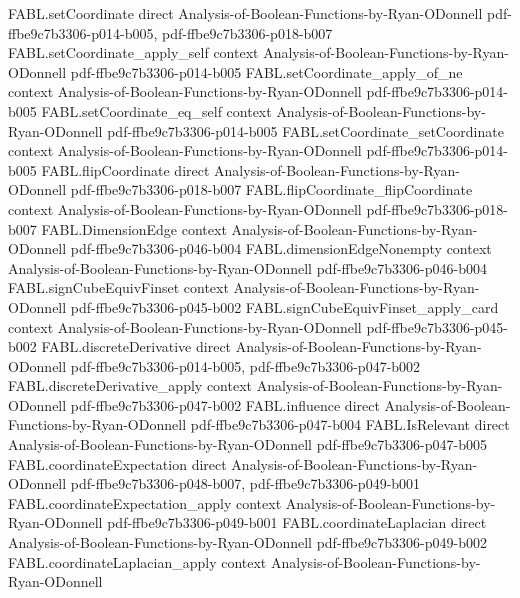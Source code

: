 \begin{theorem}
\proofstep
  {FABL.setCoordinate}
  {direct}
  {Analysis-of-Boolean-Functions-by-Ryan-ODonnell}
  {pdf-ffbe9c7b3306-p014-b005,
    pdf-ffbe9c7b3306-p018-b007}
\proofstep
  {FABL.setCoordinate_apply_self}
  {context}
  {Analysis-of-Boolean-Functions-by-Ryan-ODonnell}
  {pdf-ffbe9c7b3306-p014-b005}
\proofstep
  {FABL.setCoordinate_apply_of_ne}
  {context}
  {Analysis-of-Boolean-Functions-by-Ryan-ODonnell}
  {pdf-ffbe9c7b3306-p014-b005}
\proofstep
  {FABL.setCoordinate_eq_self}
  {context}
  {Analysis-of-Boolean-Functions-by-Ryan-ODonnell}
  {pdf-ffbe9c7b3306-p014-b005}
\proofstep
  {FABL.setCoordinate_setCoordinate}
  {context}
  {Analysis-of-Boolean-Functions-by-Ryan-ODonnell}
  {pdf-ffbe9c7b3306-p014-b005}
\proofstep
  {FABL.flipCoordinate}
  {direct}
  {Analysis-of-Boolean-Functions-by-Ryan-ODonnell}
  {pdf-ffbe9c7b3306-p018-b007}
\proofstep
  {FABL.flipCoordinate_flipCoordinate}
  {context}
  {Analysis-of-Boolean-Functions-by-Ryan-ODonnell}
  {pdf-ffbe9c7b3306-p018-b007}
\proofstep
  {FABL.DimensionEdge}
  {context}
  {Analysis-of-Boolean-Functions-by-Ryan-ODonnell}
  {pdf-ffbe9c7b3306-p046-b004}
\proofstep
  {FABL.dimensionEdgeNonempty}
  {context}
  {Analysis-of-Boolean-Functions-by-Ryan-ODonnell}
  {pdf-ffbe9c7b3306-p046-b004}
\proofstep
  {FABL.signCubeEquivFinset}
  {context}
  {Analysis-of-Boolean-Functions-by-Ryan-ODonnell}
  {pdf-ffbe9c7b3306-p045-b002}
\proofstep
  {FABL.signCubeEquivFinset_apply_card}
  {context}
  {Analysis-of-Boolean-Functions-by-Ryan-ODonnell}
  {pdf-ffbe9c7b3306-p045-b002}
\proofstep
  {FABL.discreteDerivative}
  {direct}
  {Analysis-of-Boolean-Functions-by-Ryan-ODonnell}
  {pdf-ffbe9c7b3306-p014-b005,
    pdf-ffbe9c7b3306-p047-b002}
\proofstep
  {FABL.discreteDerivative_apply}
  {context}
  {Analysis-of-Boolean-Functions-by-Ryan-ODonnell}
  {pdf-ffbe9c7b3306-p047-b002}
\proofstep
  {FABL.influence}
  {direct}
  {Analysis-of-Boolean-Functions-by-Ryan-ODonnell}
  {pdf-ffbe9c7b3306-p047-b004}
\proofstep
  {FABL.IsRelevant}
  {direct}
  {Analysis-of-Boolean-Functions-by-Ryan-ODonnell}
  {pdf-ffbe9c7b3306-p047-b005}
\proofstep
  {FABL.coordinateExpectation}
  {direct}
  {Analysis-of-Boolean-Functions-by-Ryan-ODonnell}
  {pdf-ffbe9c7b3306-p048-b007,
    pdf-ffbe9c7b3306-p049-b001}
\proofstep
  {FABL.coordinateExpectation_apply}
  {context}
  {Analysis-of-Boolean-Functions-by-Ryan-ODonnell}
  {pdf-ffbe9c7b3306-p049-b001}
\proofstep
  {FABL.coordinateLaplacian}
  {direct}
  {Analysis-of-Boolean-Functions-by-Ryan-ODonnell}
  {pdf-ffbe9c7b3306-p049-b002}
\proofstep
  {FABL.coordinateLaplacian_apply}
  {context}
  {Analysis-of-Boolean-Functions-by-Ryan-ODonnell}

\end{theorem}
